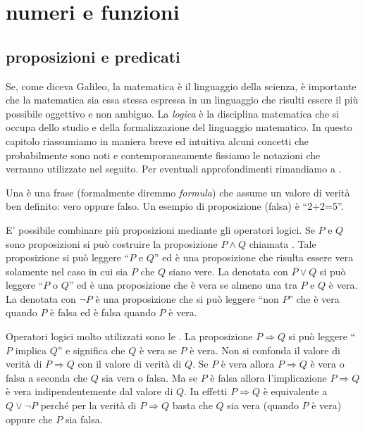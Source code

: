 \chapter{numeri e funzioni}


\section{proposizioni e predicati}

Se, come diceva Galileo, la matematica è il linguaggio della scienza,
è importante che la matematica sia essa stessa espressa in un linguaggio
che risulti essere il più possibile oggettivo e non ambiguo.
La \emph{logica} è la disciplina matematica che si occupa
dello studio e della formalizzazione del linguaggio matematico.
In questo capitolo riassumiamo in maniera breve ed intuitiva
alcuni concetti che probabilmente sono noti e contemporaneamente
fissiamo le notazioni che verranno utilizzate nel seguito.
Per eventuali approfondimenti rimandiamo a \cite{appunti_logica}.

Una 
è una frase (formalmente diremmo \emph{formula})
che assume un valore di verità ben
definito: vero oppure falso.
Un esempio di proposizione (falsa) è ``2+2=5''.

E' possibile combinare più proposizioni mediante
gli operatori logici. Se $P$ e $Q$ sono proposizioni
si può costruire la proposizione $P \land Q$
chiamata . Tale proposizione
si può leggere ``$P$ e $Q$'' ed è una proposizione
che risulta essere vera solamente nel caso in cui sia
$P$ che $Q$ siano vere.
La  denotata con $P \lor Q$
si può leggere ``$P$ o $Q$'' ed è una proposizione che
è vera se almeno una tra $P$ e $Q$ è vera.
La  denotata con $\lnot P$ è una
proposizione che si può leggere ``non $P$'' che
è vera quando $P$ è falsa ed è falsa quando $P$ è vera.

Operatori logici molto utilizzati sono le .
La proposizione $P\Rightarrow Q$ si può leggere ``$P$ implica $Q$''
e significa che $Q$ è vera se $P$ è vera. Non si confonda
il valore di verità di $P\Rightarrow Q$ con il valore di verità
di $Q$. Se $P$ è vera allora $P\Rightarrow Q$ è vera o falsa
a seconda che $Q$ sia vera o falsa. Ma se $P$ è falsa allora
l'implicazione $P\Rightarrow Q$ è vera indipendentemente dal
valore di $Q$. In effetti $P\Rightarrow Q$ è equivalente a
$Q \lor \lnot P$ perché per la verità di $P\Rightarrow Q$
basta che $Q$ sia vera (quando $P$ è vera) oppure che $P$ sia falsa.

